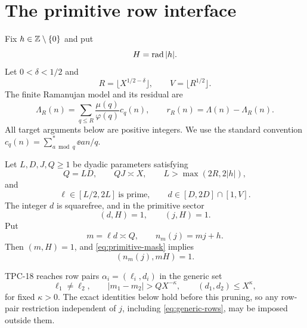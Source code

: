 \section{The primitive row interface}
\label{sec:interface}

Fix \(h\in\mathbb Z\setminus\{0\}\) and put
\begin{equation}
 H=\operatorname{rad}|h|.
 \label{eq:H}
\end{equation}
Let \(0<\delta<1/2\) and
\begin{equation}
 R=\lfloor X^{1/2-\delta}\rfloor,
 \qquad V=\lfloor R^{1/2}\rfloor.
 \label{eq:RV}
\end{equation}
The finite Ramanujan model and its residual are
\begin{equation}
 \Lambda_R(n)=\sum_{q\le R}\frac{\mu(q)}{\varphi(q)}c_q(n),
 \qquad r_R(n)=\Lambda(n)-\Lambda_R(n).
 \label{eq:model-residual}
\end{equation}
All target arguments below are positive integers.  We use the standard
convention \(c_q(n)=\sum_{a\bmod q}^{*}\ee{an/q}\).

Let \(L,D,J,Q\ge1\) be dyadic parameters satisfying
\begin{equation}
 Q=LD,\qquad QJ\asymp X,\qquad
 L>\max(2R,2|h|),
 \label{eq:row-geometry-a}
\end{equation}
and
\begin{equation}
 \ell\in[L/2,2L]\ \text{is prime},\qquad
 d\in[D,2D]\cap[1,V].
 \label{eq:row-geometry}
\end{equation}
The integer \(d\) is squarefree, and in the primitive sector
\begin{equation}
 (d,H)=1,\qquad (j,H)=1.
 \label{eq:primitive-mask}
\end{equation}
Put
\begin{equation}
 m=\ell d\asymp Q,\qquad n_m(j)=mj+h.
 \label{eq:m-row}
\end{equation}
Then \((m,H)=1\), and \eqref{eq:primitive-mask} implies
\begin{equation}
 (n_m(j),mH)=1.
 \label{eq:target-coprime}
\end{equation}

TPC-18 reaches row pairs \(\alpha_i=(\ell_i,d_i)\) in the generic set
\begin{equation}
 \ell_1\ne\ell_2,\qquad
 |m_1-m_2|>QX^{-\kappa},\qquad
 (d_1,d_2)\le X^\kappa,
 \label{eq:generic-rows}
\end{equation}
for fixed \(\kappa>0\).  The exact identities below hold before this
pruning, so any row-pair restriction independent of \(j\), including
\eqref{eq:generic-rows}, may be imposed outside them.

